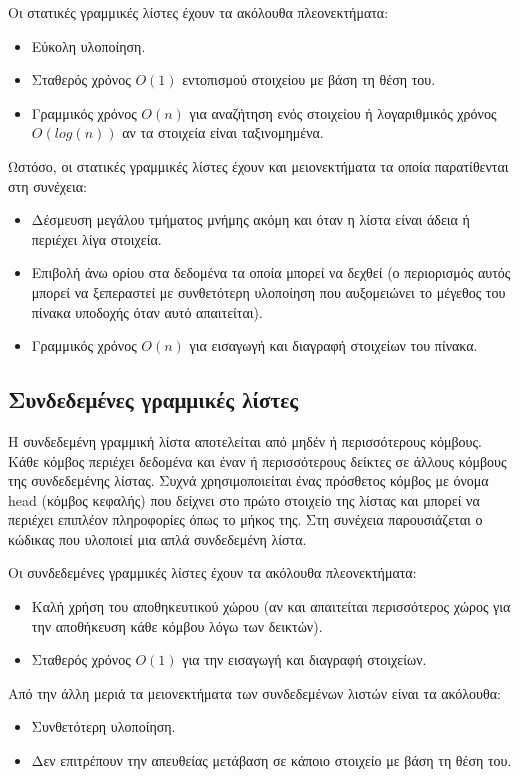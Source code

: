 Οι στατικές γραμμικές λίστες έχουν τα ακόλουθα πλεονεκτήματα:
\begin{itemize}[nolistsep]
\item Εύκολη υλοποίηση. 
\item Σταθερός χρόνος $O(1)$ εντοπισμού στοιχείου με βάση τη θέση του.
\item Γραμμικός χρόνος $O(n)$ για αναζήτηση ενός στοιχείου ή λογαριθμικός χρόνος $O(log(n))$ αν τα στοιχεία είναι ταξινομημένα.
\end{itemize}

Ωστόσο, οι στατικές γραμμικές λίστες έχουν και μειονεκτήματα τα οποία παρατίθενται στη συνέχεια:
\begin{itemize}[nolistsep]
\item Δέσμευση μεγάλου τμήματος μνήμης ακόμη και όταν η λίστα είναι άδεια ή περιέχει λίγα στοιχεία. 
\item Επιβολή άνω ορίου στα δεδομένα τα οποία μπορεί να δεχθεί (ο περιορισμός αυτός μπορεί να ξεπεραστεί με συνθετότερη υλοποίηση που αυξομειώνει το μέγεθος του πίνακα υποδοχής όταν αυτό απαιτείται).
\item Γραμμικός χρόνος $O(n)$ για εισαγωγή και διαγραφή στοιχείων του πίνακα.
\end{itemize}


\subsection{Συνδεδεμένες γραμμικές λίστες}
Η συνδεδεμένη γραμμική λίστα αποτελείται από μηδέν ή περισσότερους κόμβους. Κάθε κόμβος περιέχει δεδομένα και έναν ή περισσότερους δείκτες σε άλλους κόμβους της συνδεδεμένης λίστας. Συχνά χρησιμοποιείται ένας πρόσθετος κόμβος με όνομα head (κόμβος κεφαλής) που δείχνει στο πρώτο στοιχείο της λίστας και μπορεί να περιέχει επιπλέον πληροφορίες όπως το μήκος της. Στη συνέχεια παρουσιάζεται ο κώδικας που υλοποιεί μια απλά συνδεδεμένη λίστα.








Οι συνδεδεμένες γραμμικές λίστες έχουν τα ακόλουθα πλεονεκτήματα:
\begin{itemize}[nolistsep]
\item Καλή χρήση του αποθηκευτικού χώρου (αν και απαιτείται περισσότερος χώρος για την αποθήκευση κάθε κόμβου λόγω των δεικτών). 
\item Σταθερός χρόνος $O(1)$ για την εισαγωγή και διαγραφή στοιχείων.
\end{itemize}
Από την άλλη μεριά τα μειονεκτήματα των συνδεδεμένων λιστών είναι τα ακόλουθα:
\begin{itemize}[nolistsep]
\item Συνθετότερη υλοποίηση.
\item Δεν επιτρέπουν την απευθείας μετάβαση σε κάποιο στοιχείο με βάση τη θέση του.
\end{itemize}



